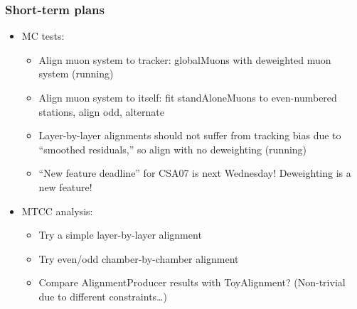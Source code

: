 \documentclass[compress]{beamer}
\begin{document}
\begin{frame}
\frametitle{Short-term plans}
\begin{itemize}\setlength{\itemsep}{0.25 cm}
\item MC tests:

\begin{itemize}
\item Align muon system to tracker: globalMuons with deweighted muon system (running)

\item Align muon system to itself: fit standAloneMuons to
  even-numbered stations, align odd, alternate

\item Layer-by-layer alignments should not suffer from tracking bias
  due to ``smoothed residuals,'' so align with no deweighting (running)

\item ``New feature deadline'' for CSA07 is next Wednesday!  Deweighting is a new feature!
\end{itemize}

\item MTCC analysis:

\begin{itemize}
\item Try a simple layer-by-layer alignment

\item Try even/odd chamber-by-chamber alignment

\item Compare AlignmentProducer results with ToyAlignment? (Non-trivial due to different constraints\ldots)

\end{itemize}
\end{itemize}
\label{numpages}
\end{frame}
\end{document}
